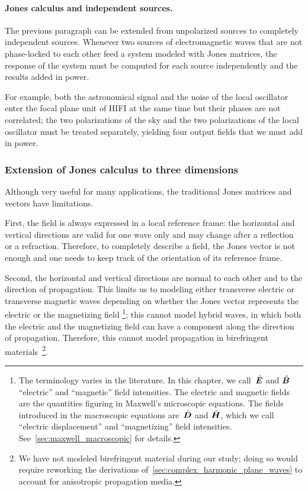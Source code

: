 \paragraph{Jones calculus and independent sources.}
\label{sec:jones_independent}
The previous paragraph can be extended from unpolarized sources to completely independent sources.
Whenever two sources of electromagnetic waves that are not phase-locked to each other feed a system modeled with Jones matrices, the response of the system must be computed for each source independently and the results added in power.

For example, both the astronomical signal and the noise of the local oscillator enter the focal plane unit of HIFI at the same time but their phases are not correlated;
the two polarizations of the sky and the two polarizations of the local oscillator must be treated separately, yielding four output fields that we must add in power.




\subsubsection{Extension of Jones calculus to three dimensions}
Although very useful for many applications, the traditional Jones matrices and vectors have limitations.

First, the field is always expressed in a local reference frame: the horizontal and vertical directions are valid for one wave only and may change after a reflection or a refraction.
Therefore, to completely describe a field, the Jones vector is not enough and one needs to keep track of the orientation of its reference frame.

Second, the horizontal and vertical directions are normal to each other and to the direction of propagation.
This limits us to modeling either transverse electric or transverse magnetic waves depending on whether the Jones vector represents the electric or the magnetizing field%
\footnote{
The terminology varies in the literature.
In this chapter, we call~$\hat{\bm{E}}$ and $\hat{\bm{B}}$ ``electric'' and ``magnetic'' field intensities.
The electric and magnetic fields are the quantities figuring in Maxwell's microscopic equations.
The fields introduced in the macroscopic equations are~$\hat{\bm{D}}$ and $\hat{\bm{H}}$, which we call ``electric displacement'' and ``magnetizing'' field intensities.
See~\cref{sec:maxwell_macroscopic} for details.
};
this cannot model hybrid waves, in which both the electric and the magnetizing field can have a component along the direction of propagation.
Therefore, this cannot model propagation in birefringent materials~\footnote{We have not modeled birefringent material during our study; doing so would require reworking the derivations of~\cref{sec:complex_harmonic_plane_waves} to account for anisotropic propagation media.}.

